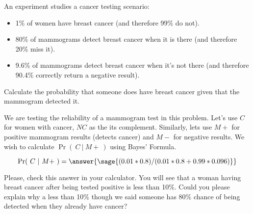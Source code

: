 \documentclass{ximera}
\begin{document}
\begin{problem}
An experiment studies a cancer testing scenario:
\begin{itemize}
    \item 1\% of women have breast cancer (and therefore 99\% do not).
    \item 80\% of mammograms detect breast cancer when it is there (and therefore 20\% miss it).
    \item 9.6\% of mammograms detect breast cancer when it’s not there (and therefore 90.4\% correctly return a negative result).
\end{itemize}
Calculate the probability that someone does have breast cancer given that the mammogram detected it.

\begin{hint}
We are testing the reliability of a mammogram test in this problem. Let's use $C$ for women with cancer,  $NC$ as the its complement. Similarly, lets use $M+$ for positive mammogram results (detects cancer) and $M-$ for negative results. We wish to calculate $\Pr(~C~|~M+~)$ using Bayes' Formula.
\end{hint}

$$\Pr(~C~|~M+~)
=\answer{\sage{(0.01*0.8)/(0.01*0.8+0.99*0.096)}}
$$

Please, check this answer in your calculator. You will see that a woman having breast cancer after being tested positive is less than 10\%. Could you please explain why a less than 10\% though we said someone has 80\% chance of being detected when they already have cancer?
\begin{freeResponse}

\end{freeResponse}
\end{problem}
\end{document}
